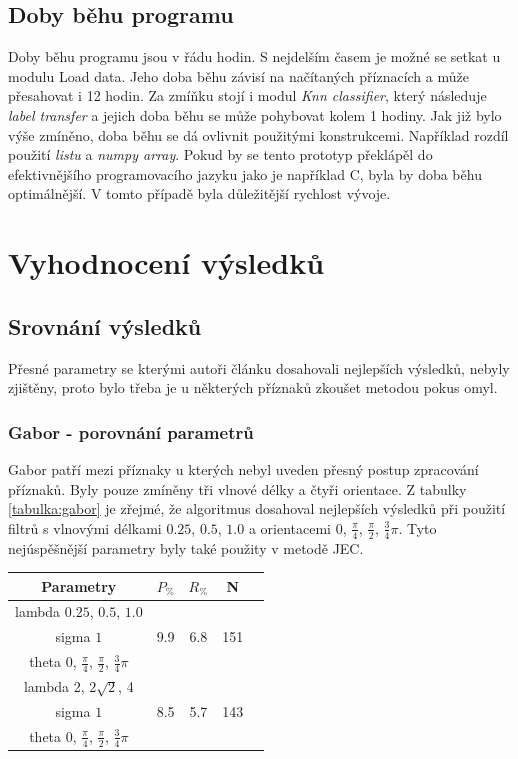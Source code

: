 \documentclass[czech,BP]{thesiskiv}
\begin{document}
\section{Doby běhu programu}
\par Doby běhu programu jsou v řádu hodin. S nejdelším časem je možné se setkat u modulu Load data. Jeho doba běhu závisí na načítaných příznacích a může přesahovat i 12 hodin. Za zmíňku stojí i modul \textit{Knn classifier}, který následuje \textit{label transfer} a jejich doba běhu se může pohybovat kolem 1 hodiny. Jak již bylo výše zmíněno, doba běhu se dá ovlivnit použitými konstrukcemi. Například rozdíl použití \textit{listu} a \textit{numpy array}.
Pokud by se tento prototyp překlápěl do efektivnějšího programovacího jazyku jako je například C, byla by doba běhu optimálnější. V tomto případě byla důležitější rychlost vývoje.

\chapter{Vyhodnocení výsledků}

\section{Srovnání výsledků}
Přesné parametry se kterými autoři článku \cite{JEC2} dosahovali nejlepších výsledků, nebyly zjištěny, proto bylo třeba je u některých příznaků zkoušet metodou pokus omyl. 


\subsection{Gabor - porovnání parametrů}
Gabor patří mezi příznaky u kterých nebyl uveden přesný postup zpracování příznaků. Byly pouze zmíněny tři vlnové délky a čtyři orientace. Z tabulky \ref{tabulka:gabor} je zřejmé, že algoritmus dosahoval nejlepších výsledků při použití filtrů s vlnovými délkami $0.25$, $0.5$, $1.0$ a orientacemi $0$, $\frac{\pi}{4}$, $\frac{\pi}{2}$, $\frac{3}{4}\pi$. Tyto nejúspěšnější parametry byly také použity v metodě JEC.
\begin{center}
\begin{tabular}{ |c|c|c|c|c| }
\hline
Parametry & $P_{\%}$ & $R_{\%}$ & N \\ \hline
 lambda $0.25$, $0.5$, $1.0$ & \multirow{3}{*}{9.9} & \multirow{3}{*}{6.8} & \multirow{3}{*}{151} \\
 sigma $1$ & & & \\
 theta $0$, $\frac{\pi}{4}$, $\frac{\pi}{2}$, $\frac{3}{4}\pi$ & & & \\ \hline
 lambda 2, $2\sqrt{2}$, 4 & \multirow{3}{*}{8.5} & \multirow{3}{*}{5.7} & \multirow{3}{*}{143} \\
 sigma $1$ & & & \\
 theta $0$, $\frac{\pi}{4}$, $\frac{\pi}{2}$, $\frac{3}{4}\pi$ & & & \\ 
\hline
\end{tabular}
\label{tabulka:gabor}
\end{center}
\end{document}
